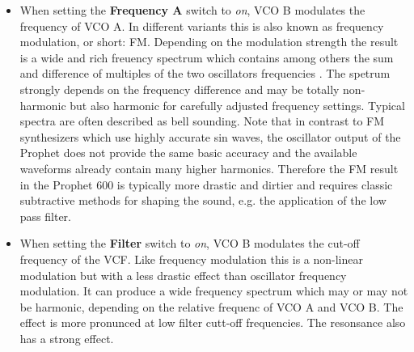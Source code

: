 \begin{itemize}
  \item When setting the \textbf{Frequency A} switch to \textit{on}, VCO B modulates the frequency of VCO A. In different variants this is also known as frequency modulation, or short: FM. Depending on the modulation strength the result is a wide and rich freuency spectrum which contains among others the sum and difference of multiples of the two oscillators frequencies . The spetrum strongly depends on the frequency difference and may be totally non-harmonic but also harmonic for carefully adjusted frequency settings. Typical spectra are often described as bell sounding. Note that in contrast to FM synthesizers which use highly accurate sin waves, the oscillator output of the Prophet does not provide the same basic accuracy and the available waveforms already contain many higher harmonics. Therefore the FM result in the Prophet 600 is typically more drastic and dirtier and requires classic subtractive methods for shaping the sound, e.g. the application of the low pass filter. 
  \item When setting the \textbf{Filter} switch to \textit{on}, VCO B modulates the cut-off frequency of the VCF. Like frequency modulation this is a non-linear modulation but with a less drastic effect than oscillator frequency modulation. It can produce a wide frequency spectrum which may or may not be harmonic, depending on the relative frequenc of VCO A and VCO B. The effect is more pronunced at low filter cutt-off frequencies. The resonsance also has a strong effect.  
\end{itemize}


